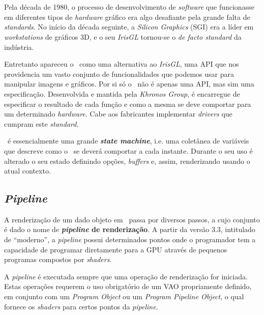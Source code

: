 \section{\opengl}
\label{sec::arte:opengl}

Pela década de 1980, o processo de desenvolvimento de \textit{software} que funcionasse em diferentes tipos de \textit{hardware} gráfico era algo desafiante pela grande falta de \textit{standards}. No início da década seguinte, a \textit{Silicon Graphics} (SGI) era a líder em \textit{workstations} de gráficos 3D, e o seu \textit{IrisGL} tornou-se o \textit{de facto standard} da indústria.

Entretanto apareceu o \opengl~como uma alternativa ao \textit{IrisGL}, uma \ac{API} que nos providencia um vasto conjunto de funcionalidades que podemos usar para manipular imagens e gráficos. Por si só o \opengl~não é apenas uma \ac{API}, mas sim uma especificação. Desenvolvida e mantida pela \textit{Khronos Group}, é encarregue de especificar o resultado de cada função e como a mesma se deve comportar para um determinado \textit{hardware}. Cabe aos fabricantes implementar \textit{drivers} que cumpram este \textit{standard}.

\opengl~é essencialmente uma grande \textbf{\textit{state machine}}, i.e. uma coletânea de variáveis que descreve como o \opengl~se deverá comportar a cada instante. Durante o seu uso é alterado o seu estado definindo opções, \textit{buffers} e, assim, renderizando usando o atual contexto.


\subsection{\textit{Pipeline}}
\label{ssec::arte:opengl:pipeline}

A renderização de um dado objeto em \opengl~passa por diversos passos, a cujo conjunto é dado o nome de \textbf{\textit{pipeline} de renderização}. A partir da versão 3.3, intitulado de ``\opengl moderno'', a \textit{pipeline} possui determinados pontos onde o programador tem a capacidade de programar diretamente para a \ac{GPU} através de pequenos programas compostos por \textit{shaders}.

A \textit{pipeline} é executada sempre que uma operação de renderização for iniciada. Estas operações requerem o uso obrigatório de um \ac{VAO} propriamente definido, em conjunto com um \textit{Program Object} ou um \textit{Program Pipeline Object}, o qual fornece os \textit{shaders} para certos pontos da \textit{pipeline}.

